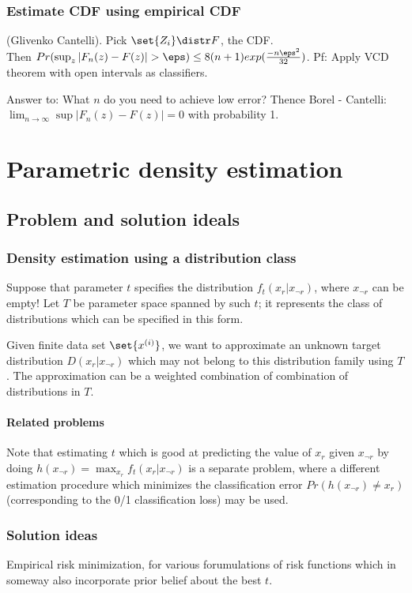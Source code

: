 \documentclass[oneside, article]{memoir}
\begin{document}
\subsection{Estimate CDF using empirical CDF}
(Glivenko Cantelli). Pick $\set{Z_i} \distr F$, the CDF. \\
Then $Pr(\sup_z |F_n(z) - F(z)| > \eps) \leq 8(n+1)exp(\frac{-n\eps^{2}}{32})$. Pf: Apply VCD theorem with open intervals as classifiers.

Answer to: What $n$ do you need to achieve low error? Thence Borel - Cantelli: $\lim_{n \to \infty} \sup |F_n(z) - F(z)| = 0$ with probability 1.

\chapter{Parametric density estimation}
\section{Problem and solution ideals}
\subsection{Density estimation using a distribution class}
Suppose that parameter $t$ specifies the distribution $f_t(x_r|x_{\lnot r})$, where $x_{\lnot r}$ can be empty! Let $T$ be parameter space spanned by such $t$; it represents the class of distributions which can be specified in this form.

Given finite data set $\set{x^{(i)}}$, we want to approximate an unknown target distribution $D(x_r|x_{\lnot r})$ which may not belong to this distribution family using $T$. The approximation can be a weighted combination of combination of distributions in $T$.

\subsubsection{Related problems}
Note that estimating $t$ which is good at predicting the value of $x_r$ given $x_{\lnot r}$ by doing $h(x_{\lnot r}) = \max_{x_r} f_t(x_r|x_{\lnot r})$ is a separate problem, where a different estimation procedure which minimizes the classification error $Pr(h(x_{\lnot r}) \neq x_r)$ (corresponding to the 0/1 classification loss) may be used.

\subsection{Solution ideas}
Empirical risk minimization, for various forumulations of risk functions which in someway also incorporate prior belief about the best $t$.
\end{document}
